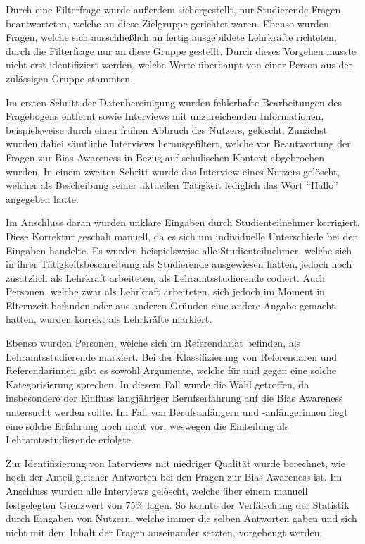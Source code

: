 Durch eine Filterfrage wurde außerdem sichergestellt, nur Studierende Fragen beantworteten, welche an diese Zielgruppe gerichtet waren.
Ebenso wurden Fragen, welche sich ausschließlich an fertig ausgebildete Lehrkräfte richteten, durch die Filterfrage nur an diese Gruppe gestellt.
Durch dieses Vorgehen musste nicht erst identifiziert werden, welche Werte überhaupt von einer Person aus der zulässigen Gruppe stammten.

Im ersten Schritt der Datenbereinigung wurden fehlerhafte Bearbeitungen des Fragebogens entfernt sowie Interviews mit unzureichenden Informationen, beispielsweise durch einen frühen Abbruch des Nutzers, gelöscht.
Zunächst wurden dabei sämtliche Interviews herausgefiltert, welche vor Beantwortung der Fragen zur Bias Awareness in Bezug auf schulischen Kontext abgebrochen wurden.
In einem zweiten Schritt wurde das Interview eines Nutzers gelöscht, welcher als Bescheibung seiner aktuellen Tätigkeit lediglich das Wort ``Hallo'' angegeben hatte.

Im Anschluss daran wurden unklare Eingaben durch Studienteilnehmer korrigiert.
Diese Korrektur geschah manuell, da es sich um individuelle Unterschiede bei den Eingaben handelte.
Es wurden beispielsweise alle Studienteilnehmer, welche sich in ihrer Tätigkeitsbeschreibung als Studierende ausgewiesen hatten, jedoch noch zusätzlich als Lehrkraft arbeiteten, als Lehramtsstudierende codiert.
Auch Personen, welche zwar als Lehrkraft arbeiteten, sich jedoch im Moment in Elternzeit befanden oder aus anderen Gründen eine andere Angabe gemacht hatten, wurden korrekt als Lehrkräfte markiert.

Ebenso wurden Personen, welche sich im Referendariat befinden, als Lehramtsstudierende markiert.
Bei der Klassifizierung von Referendaren und Referendarinnen gibt es sowohl Argumente, welche für und gegen eine solche Kategorisierung sprechen.
In diesem Fall wurde die Wahl getroffen, da insbesondere der Einfluss langjähriger Berufserfahrung auf die Bias Awareness untersucht werden sollte.
Im Fall von Berufsanfängern und -anfängerinnen liegt eine solche Erfahrung noch nicht vor, weswegen die Einteilung als Lehramtsstudierende erfolgte.

Zur Identifizierung von Interviews mit niedriger Qualität wurde berechnet, wie hoch der Anteil gleicher Antworten bei den Fragen zur Bias Awareness ist.
Im Anschluss wurden alle Interviews gelöscht, welche über einem manuell festgelegten Grenzwert von 75\% lagen.
So konnte der Verfälschung der Statistik durch Eingaben von Nutzern, welche immer die selben Antworten gaben und sich nicht mit dem Inhalt der Fragen auseinander setzten, vorgebeugt werden.

